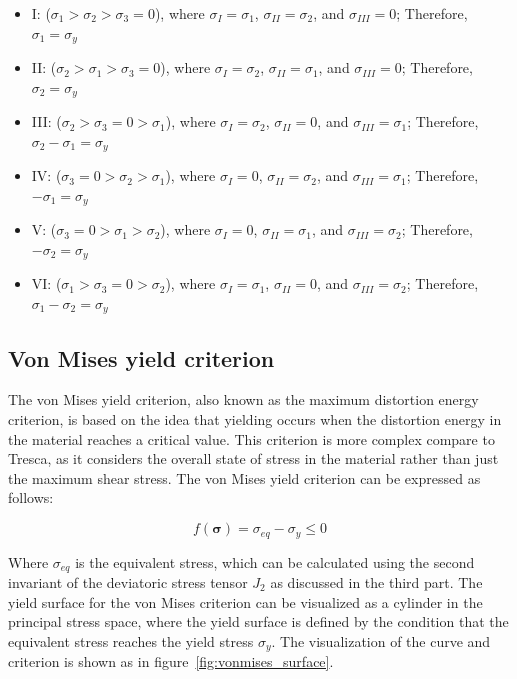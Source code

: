 \documentclass[12pt]{article}
\begin{document}
\begin{itemize}
    \item I: ($\sigma_1 > \sigma_2 > \sigma_3 = 0$), where $\sigma_{I} = \sigma_1$, $\sigma_{II} = \sigma_2$, and $\sigma_{III} = 0$; Therefore, $\sigma_1 = \sigma_y$
    \item II: ($\sigma_2 > \sigma_1 > \sigma_3 = 0$), where $\sigma_{I} = \sigma_2$, $\sigma_{II} = \sigma_1$, and $\sigma_{III} = 0$; Therefore, $\sigma_2 = \sigma_y$
    \item III: ($\sigma_2 > \sigma_3 = 0 > \sigma_1$), where $\sigma_{I} = \sigma_2$, $\sigma_{II} = 0$, and $\sigma_{III} = \sigma_1$; Therefore, $\sigma_2 - \sigma_1 = \sigma_y$
    \item IV: ($\sigma_3 = 0 > \sigma_2 > \sigma_1$), where $\sigma_{I} = 0$, $\sigma_{II} = \sigma_2$, and $\sigma_{III} = \sigma_1$; Therefore, $-\sigma_1 = \sigma_y$
    \item V: ($\sigma_3 = 0 > \sigma_1 > \sigma_2$), where $\sigma_{I} = 0$, $\sigma_{II} = \sigma_1$, and $\sigma_{III} = \sigma_2$; Therefore, $-\sigma_2 = \sigma_y$
    \item VI: ($\sigma_1 > \sigma_3 = 0 > \sigma_2$), where $\sigma_{I} = \sigma_1$, $\sigma_{II} = 0$, and $\sigma_{III} = \sigma_2$; Therefore, $\sigma_1 - \sigma_2 = \sigma_y$
\end{itemize}
\subsection{Von Mises yield criterion}

\hspace{2em}The von Mises yield criterion, also known as the maximum distortion energy criterion, is based on the idea
that yielding occurs when the distortion energy in the material reaches a critical value. This criterion is 
more complex compare to Tresca, as it considers the overall state of stress in the material rather than just
the maximum shear stress. The von Mises yield criterion can be expressed as follows:

\begin{equation}
    f(\boldsymbol{\sigma}) = \sigma_{eq} - \sigma_y \leq 0
\end{equation}

Where $\sigma_{eq}$ is the equivalent stress, which can be calculated using the second invariant of the deviatoric stress tensor $J_2$ as discussed in the third part.
The yield surface for the von Mises criterion can be visualized as a cylinder in the principal stress space, 
where the yield surface is defined by the condition that the equivalent stress reaches the yield stress 
$\sigma_y$. The visualization of the curve and criterion is shown as in figure~\ref{fig:vonmises_surface}.
\end{document}

